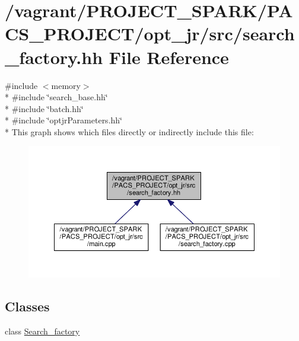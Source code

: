 \hypertarget{search__factory_8hh}{\section{/vagrant/\-P\-R\-O\-J\-E\-C\-T\-\_\-\-S\-P\-A\-R\-K/\-P\-A\-C\-S\-\_\-\-P\-R\-O\-J\-E\-C\-T/opt\-\_\-jr/src/search\-\_\-factory.hh File Reference}
\label{search__factory_8hh}
}
{\ttfamily \#include $<$memory$>$}\\*
{\ttfamily \#include \char`\"{}search\-\_\-base.\-hh\char`\"{}}\\*
{\ttfamily \#include \char`\"{}batch.\-hh\char`\"{}}\\*
{\ttfamily \#include \char`\"{}optjr\-Parameters.\-hh\char`\"{}}\\*
This graph shows which files directly or indirectly include this file\-:\nopagebreak
\begin{figure}[H]
\begin{center}
\leavevmode
\includegraphics[width=350pt]{search__factory_8hh__dep__incl}
\end{center}
\end{figure}
\subsection*{Classes}
\begin{DoxyCompactItemize}
\item 
class \hyperlink{classSearch__factory}{Search\-\_\-factory}
\end{DoxyCompactItemize}
